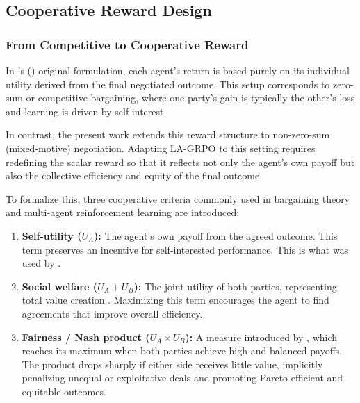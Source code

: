 \documentclass[12pt,a4paper]{article}
\begin{document}
\subsection{Cooperative Reward Design}\label{sec:cooperative_reward}

\subsubsection{From Competitive to Cooperative Reward}

In \citeauthor{franceschetti2025advantage}'s (\citeyear{franceschetti2025advantage}) original formulation, each agent's return is based purely on its individual utility derived from the final negotiated outcome. This setup corresponds to zero-sum or competitive bargaining, where one party's gain is typically the other's loss and learning is driven by self-interest.
\par
In contrast, the present work extends this reward structure to non-zero-sum (mixed-motive) negotiation. Adapting LA-GRPO to this setting requires redefining the scalar reward so that it reflects not only the agent's own payoff but also the collective efficiency and equity of the final outcome.
\par
To formalize this, three cooperative criteria commonly used in bargaining theory and multi-agent reinforcement learning are introduced:

\begin{enumerate}[label={}, leftmargin=0pt]
    \item \textbf{Self-utility ($U_A$):} The agent's own payoff from the agreed outcome. This term preserves an incentive for self-interested performance. This is what was used by \citet{franceschetti2025advantage}.
    \item \textbf{Social welfare ($U_A + U_B$):} The joint utility of both parties, representing total value creation \citep{pmlr-v162-liu22l}. Maximizing this term encourages the agent to find agreements that improve overall efficiency.
    \item \textbf{Fairness / Nash product ($U_A \times U_B$):} A measure introduced by \citet{Nash1950THEBP}, which reaches its maximum when both parties achieve high and balanced payoffs. The product drops sharply if either side receives little value, implicitly penalizing unequal or exploitative deals and promoting Pareto-efficient and equitable outcomes.
\end{enumerate}
\end{document}
